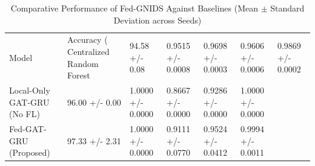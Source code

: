 \begin{table}
\caption{Comparative Performance of Fed-GNIDS Against Baselines (Mean $\pm$ Standard Deviation across Seeds)}
\label{tab:benchmark_results}
\begin{tabular}{llllll}
\toprule
Model & Accuracy (%
\midrule
Centralized Random Forest & 94.58 +/- 0.08 & 0.9515 +/- 0.0008 & 0.9698 +/- 0.0003 & 0.9606 +/- 0.0006 & 0.9869 +/- 0.0002 \\
Local-Only GAT-GRU (No FL) & 96.00 +/- 0.00 & 1.0000 +/- 0.0000 & 0.8667 +/- 0.0000 & 0.9286 +/- 0.0000 & 1.0000 +/- 0.0000 \\
Fed-GAT-GRU (Proposed) & 97.33 +/- 2.31 & 1.0000 +/- 0.0000 & 0.9111 +/- 0.0770 & 0.9524 +/- 0.0412 & 0.9994 +/- 0.0011 \\
\bottomrule
\end{tabular}
\end{table}
